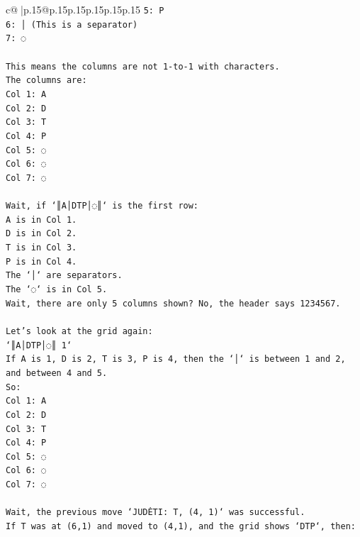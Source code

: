 \documentclass{article}
\begin{document}
{\begin{supertabular}{c@{$\;$}|p{.15\linewidth}@{}p{.15\linewidth}p{.15\linewidth}p{.15\linewidth}p{.15\linewidth}p{.15\linewidth}}
{{{\texttt{5: P} \\
\texttt{6: │ (This is a separator)} \\
\texttt{7: ◌} \\
\\ 
\texttt{This means the columns are not 1{-}to{-}1 with characters.} \\
\texttt{The columns are:} \\
\texttt{Col 1: A} \\
\texttt{Col 2: D} \\
\texttt{Col 3: T} \\
\texttt{Col 4: P} \\
\texttt{Col 5: ◌} \\
\texttt{Col 6: ◌} \\
\texttt{Col 7: ◌} \\
\\ 
\texttt{Wait, if `║A│DTP│◌║` is the first row:} \\
\texttt{A is in Col 1.} \\
\texttt{D is in Col 2.} \\
\texttt{T is in Col 3.} \\
\texttt{P is in Col 4.} \\
\texttt{The `│` are separators.} \\
\texttt{The `◌` is in Col 5.} \\
\texttt{Wait, there are only 5 columns shown? No, the header says 1234567.} \\
\\ 
\texttt{Let's look at the grid again:} \\
\texttt{`║A│DTP│◌║ 1`} \\
\texttt{If A is 1, D is 2, T is 3, P is 4, then the `│` is between 1 and 2, and between 4 and 5.} \\
\texttt{So:} \\
\texttt{Col 1: A} \\
\texttt{Col 2: D} \\
\texttt{Col 3: T} \\
\texttt{Col 4: P} \\
\texttt{Col 5: ◌} \\
\texttt{Col 6: ◌} \\
\texttt{Col 7: ◌} \\
\\ 
\texttt{Wait, the previous move `JUDĖTI: T, (4, 1)` was successful.} \\
\texttt{If T was at (6,1) and moved to (4,1), and the grid shows `DTP`, then:} \\
}}}
\end{supertabular}}
\end{document}
